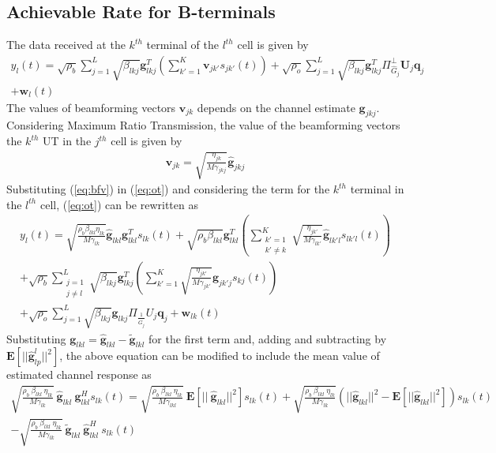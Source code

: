 \documentclass[10pt, a4paper, twoside,fleqn]{article}
\begin{document}
\subsection{Achievable Rate for B-terminals}

The data received at the $k^{th}$ terminal of the $l^{th}$ cell is given by
\begin{eqnarray}\label{eq:ot}
 	y_{l}(t) = \sqrt{\rho_b}\sum_{j=1}^{L} \sqrt{\beta_{lkj}} \pmb{g}_{lkj}^{T} \left(\sum_{k'=1}^{K}\pmb{v}_{jk'}s_{jk'}(t)\right)
 		      + \sqrt{\rho_o}\sum_{j=1}^{L}\sqrt{\beta_{lkj}}\pmb{g}^T_{lkj} \Pi^{\perp}_{{\widehat{G}_j}} \pmb{U}_j\pmb{q}_{j} \nonumber \\
 		      + \pmb{w}_{l}(t)
\end{eqnarray}  
The values of beamforming vectors $\pmb{v}_{jk}$ depends on the channel estimate $\pmb{g}_{jkj}$. Considering Maximum Ratio Transmission, the value of the beamforming vectors the $k^{th}$ UT in the $j^{th}$ cell is given by
\begin{eqnarray}\label{eq:bfv}
	\pmb{v}_{jk} = \sqrt{\frac{\eta_{jk}}{M\gamma_{jkj}}}\pmb{\hat g}_{jkj}
\end{eqnarray}
Substituting (\ref{eq:bfv}) in (\ref{eq:ot}) and considering the term for the $k^{th}$ terminal in the $l^{th}$ cell, (\ref{eq:ot}) can be rewritten as
\begin{eqnarray}\label{eqn:completeot}
    y_{l}(t) = \sqrt{\frac{\rho_b\beta_{lkl}\eta_{lk}}{M\gamma_{lk}}}\pmb{\hat g}_{lkl} \pmb{g}_{lkl}^Ts_{lk}(t)
                  + \sqrt{\rho_b\beta_{lkl}} \pmb{g}_{lkl}^T \left(\sum_{\substack{k'=1 \\ k' \neq k}}^{K} \sqrt{\frac{\eta_{jk'}}{M\gamma_{lk'}}}\pmb{\hat g}_{lk'l}s_{lk'l} (t)\right) \nonumber \\
		  + \sqrt{\rho_b} \sum_{\substack{j=1 \\ j \neq l}}^{L}\sqrt{\beta_{lkj}} \pmb{g}_{lkj}^T \left(\sum_{k'=1}^{K} \sqrt{\frac{\eta_{jk'}}{M\gamma_{jk'}}}\pmb{g}_{jk'j}s_{kj} (t)\right) \nonumber \\
		  + \sqrt{\rho_o}\sum_{j=1}^{L}\sqrt{\beta_{lkj}}\pmb{g}_{lkj} \Pi_{\frac{1}{\hat G_j}} U_j \pmb{q}_{j}
    	  	  + \pmb{w}_{lk}(t)
\end{eqnarray}
Substituting $\pmb{g}_{lkl} = \pmb{\hat g}_{lkl} - {\pmb{\widetilde{g}}_{lkl}}$ for the first term and, adding and subtracting by $\pmb{E}[||\pmb{\hat g}_{lp}^{l}||^2]$, the above equation can be modified to include the mean value of estimated channel response as
\begin{eqnarray} \label{eqn:otsig}
	\sqrt{\frac{\rho_b \ \beta_{lkl} \ \eta_{lk}}{M\gamma_{lk}}} \ \pmb{\hat g}_{lkl} \ \pmb{g}^H_{lkl}  s_{lk}(t)
	           =  \sqrt{\frac{\rho_b \ \beta_{lkl} \ \eta_{lk}}{M\gamma_{lkl}}} \ \pmb{E}[|| \ \pmb{\hat g}_{lkl}||^2]s_{lk}(t)
	           +  \sqrt{\frac{\rho_b \ \beta_{lkl} \ \eta_{lk}}{M\gamma_{lk}}}\left(||\pmb{\hat g}_{lkl}||^2 - \pmb{E}[||\pmb{\hat g}_{lkl}||^2]\right)s_{lk}(t) \nonumber \\
	           -   \sqrt{\frac{\rho_b \ \beta_{lkl} \ \eta_{lk}}{M\gamma_{lk}}} \ \pmb{\widetilde{g}}_{lkl} \ \pmb{\hat g}^H_{lkl} \  s_{lk}(t)
\end{eqnarray}
\end{document}
